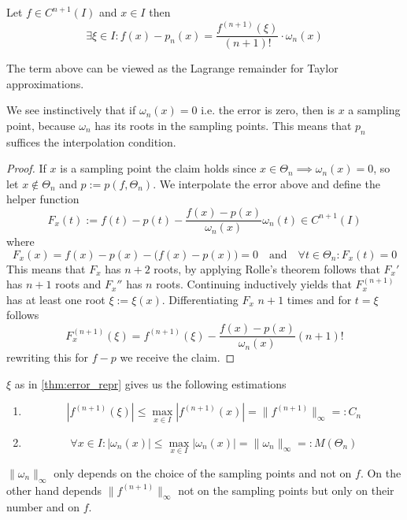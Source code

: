 \begin{theorem}\label{thm:error_repr}
   Let \(f \in C^{n+1}(I)\) and \(x \in I\) then
   \[\exists \xi \in I: f(x) - p_n(x) = \frac{f^{(n+1)}(\xi)}{(n+1)!} \cdot \omega_n(x)\]
\end{theorem}
\begin{remark}
   The term above can be viewed as the Lagrange remainder for Taylor approximations.

   We see instinctively that if \(\omega_n(x) = 0\) i.e. the error is zero, then is \(x\) a sampling point, because \(\omega_n\) has its roots in the sampling points.
   This means that \(p_n\) suffices the interpolation condition.
\end{remark}
\begin{proof}
   If \(x\) is a sampling point the claim holds since \(x \in \Theta_n \implies \omega_n(x) = 0\), so let \(x \notin \Theta_n\) and \(p := p(f, \Theta_n)\).
   We interpolate the error above and define the helper function
   \[F_x(t) := f(t) - p(t) - \frac{f(x) - p(x)}{\omega_n(x)} \omega_n(t) \in C^{n+1}(I)\]
   where
   \[F_x(x) = f(x) - p(x) - \big(f(x) - p(x)\big) = 0 \quad\text{and}\quad \forall t \in \Theta_n: F_x(t) = 0\]
   This means that \(F_x\) has \(n+2\) roots, by applying Rolle's theorem follows that \(F_x'\) has \(n+1\) roots and \(F_x''\) has \(n\) roots.
   Continuing inductively yields that \(F_x^{(n+1)}\) has at least one root \(\xi := \xi(x)\).
   Differentiating \(F_x\) \(n+1\) times and for \(t = \xi\) follows
   \[F_x^{(n+1)}(\xi) = f^{(n+1)}(\xi) - \frac{f(x) - p(x)}{\omega_n(x)} (n+1)!\]
   rewriting this for \(f - p\) we receive the claim.
\end{proof}

\begin{corollary}\label{cor:error_est}
   \(\xi\) as in \cref{thm:error_repr} gives us the following estimations
   \begin{enumerate}[label=\roman*, align=Center]
      \item \[|f^{(n+1)}(\xi)| \leq \max_{x \in I} |f^{(n+1)}(x)| = \|f^{(n+1)}\|_\infty =: C_n\]
      \item \[\forall x \in I: |\omega_n(x)| \leq \max_{x \in I}|\omega_n(x)| = \|\omega_n\|_\infty =: M(\Theta_n)\]
   \end{enumerate}
\end{corollary}
\begin{remark}
   \(\|\omega_n\|_\infty\) only depends on the choice of the sampling points and not on \(f\).
   On the other hand depends \(\|f^{(n+1)}\|_\infty\) not on the sampling points but only on their number and on \(f\).
\end{remark}

